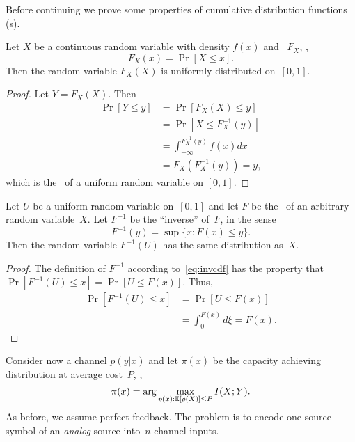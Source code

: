 Before continuing we prove some properties of cumulative distribution functions
(\cdf s).

\begin{lemma}
  \label{lem:cdfunif}
  Let $X$ be a continuous random variable with density $f(x)$ and \cdf\ $F_X$,
  \ie,
  \begin{equation*}
    F_X(x) = \Pr[X \le x].
  \end{equation*}
  Then the random variable $F_X(X)$ is uniformly distributed on~$[0,1]$.
\end{lemma}

\begin{proof}
  Let $Y = F_X(X)$. Then
  \begin{align*}
    \Pr[Y \le y] &= \Pr[F_X(X) \le y] \\
    &= \Pr[X \le F_X^{-1}(y)] \\
    &= \int_{-\infty}^{F_X^{-1}(y)} f(x) dx \\
    &= F_X(F_X^{-1}(y)) = y,
  \end{align*}
  which is the \cdf\ of a uniform random variable on $[0,1]$.
\end{proof}


\begin{lemma}
  \label{lem:invcdf}
  Let $U$ be a uniform random variable on~$[0,1]$ and let $F$ be the \cdf\ of an
  arbitrary random variable~$X$. Let $F^{-1}$ be the ``inverse'' of~$F$, in the
  sense
  \begin{equation}
    \label{eq:invcdf}
    F^{-1}(y) = \sup \{x : F(x) \le y\}.
  \end{equation}
  Then the random variable $F^{-1}(U)$ has the same distribution as~$X$.
\end{lemma}

\begin{proof}
  The definition of $F^{-1}$ according to~\eqref{eq:invcdf} has the property
  that $\Pr[F^{-1}(U) \le x] = \Pr[U \le F(x)]$. Thus,
  \begin{align*}
    \Pr[F^{-1}(U) \le x] &= \Pr[U \le F(x)] \\
    &= \int_0^{F(x)} d\xi = F(x).
  \end{align*}
\end{proof}

Consider now a channel $p(y|x)$ and let $\pi(x)$ be the capacity achieving
distribution at average cost~$P$, \ie, 
\begin{equation*}
  \pi(x) = \arg\max_{p(x): \mathbb{E}[\rho(X)] \le P} I(X;Y).
\end{equation*}
As before, we assume perfect feedback. The problem is to encode one source
symbol of an \emph{analog} source into~$n$ channel inputs. 

